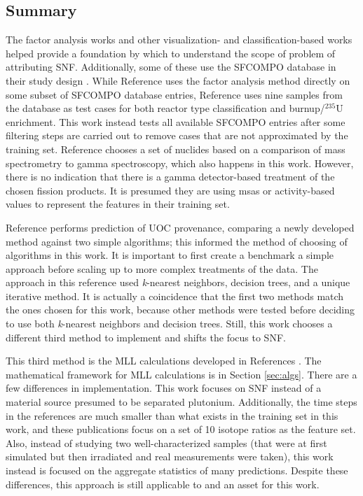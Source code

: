 \subsection{Summary}

The factor analysis works \cite{nicolaou_2006, nicolaou_pu, nicolaou_2009,
nicolaou_2014, nicolaou_2015} and other visualization- and classification-based
works \cite{pu_discrimination, jones_snf_2014, jones_viz_2014} helped provide a
foundation by which to understand the scope of problem of attributing
\gls{SNF}. Additionally, some of these use the \gls{SFCOMPO} database in their
study design \cite{nicolaou_2014, jones_viz_2014}. While Reference
\cite{nicolaou_2014} uses the factor analysis method directly on some subset of
\gls{SFCOMPO} database entries, Reference \cite{jones_viz_2014} uses nine
samples from the database as test cases for both reactor type classification
and burnup/${}^{235}\text{U}$ enrichment.  This work instead tests all
available \gls{SFCOMPO} entries after some filtering steps are carried out to
remove cases that are not approximated by the training set.  Reference
\cite{nicolaou_2009} chooses a set of nuclides based on a comparison of mass
spectrometry to gamma spectroscopy, which also happens in this work. However,
there is no indication that there is a gamma detector-based treatment of the
chosen fission products. It is presumed they are using msas or activity-based
values to represent the features in their training set. 

Reference \cite{robel_2009} performs prediction of \gls{UOC} provenance,
comparing a newly developed method against two simple algorithms; this informed
the method of choosing of algorithms in this work. It is important to first
create a benchmark a simple approach before scaling up to more complex
treatments of the data. The approach in this reference used \textit{k}-nearest
neighbors, decision trees, and a unique iterative method.  It is actually a
coincidence that the first two methods match the ones chosen for this work,
because other methods were tested before deciding to use both
\textit{k}-nearest neighbors and decision trees. Still, this work chooses a
different third method to implement and shifts the focus to \gls{SNF}. 

This third method is the \gls{MLL} calculations developed in References
\cite{mll_method, mll_validate, mll_sensitivity}.  The mathematical framework
for \gls{MLL} calculations is in Section \ref{sec:algs}.  There are a few
differences in implementation. This work focuses on \gls{SNF} instead of a
material source presumed to be separated plutonium.  Additionally, the time
steps in the references are much smaller than what exists in the training set
in this work, and these publications focus on a set of 10 isotope ratios as the
feature set.  Also, instead of studying two well-characterized samples (that
were at first simulated but then irradiated and real measurements were taken),
this work instead is focused on the aggregate statistics of many predictions.
Despite these differences, this approach is still applicable to and an asset
for this work. 

